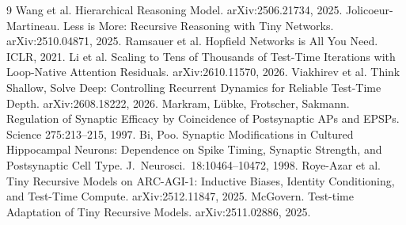 \documentclass[10pt]{article}
\begin{document}
\begin{thebibliography}{9}\small
{} Wang et al. Hierarchical Reasoning Model. arXiv:2506.21734, 2025.
 Jolicoeur-Martineau. Less is More: Recursive Reasoning with Tiny Networks. arXiv:2510.04871, 2025.
 Ramsauer et al. Hopfield Networks is All You Need. ICLR, 2021.
 Li et al. Scaling to Tens of Thousands of Test-Time Iterations with Loop-Native Attention
  Residuals. arXiv:2610.11570, 2026.
 Viakhirev et al. Think Shallow, Solve Deep: Controlling Recurrent Dynamics for
  Reliable Test-Time Depth. arXiv:2608.18222, 2026.
 Markram, L\"ubke, Frotscher, Sakmann. Regulation of Synaptic Efficacy by Coincidence of
  Postsynaptic APs and EPSPs. Science 275:213--215, 1997.
 Bi, Poo. Synaptic Modifications in Cultured Hippocampal Neurons: Dependence on Spike Timing, Synaptic
  Strength, and Postsynaptic Cell Type. J.\ Neurosci.\ 18:10464--10472, 1998.
 Roye-Azar et al. Tiny Recursive Models on ARC-AGI-1: Inductive Biases, Identity Conditioning,
  and Test-Time Compute. arXiv:2512.11847, 2025.
 McGovern. Test-time Adaptation of Tiny Recursive Models. arXiv:2511.02886, 2025.
\end{thebibliography}
\end{document}
